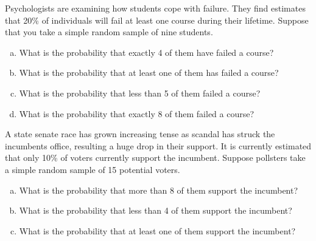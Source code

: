 \documentclass[11pt,letterpaper]{article}
\begin{document}

 Psychologists are examining how students cope with failure. They find estimates that 20\% of individuals will fail at least one course during their lifetime. Suppose that you take a simple random sample of nine students. 
	\begin{enumerate}[(a)]
	\item What is the probability that exactly 4 of them have failed a course?
	\item What is the probability that at least one of them has failed a course?
	\item What is the probability that less than 5 of them failed a course? 
	\item What is the probability that exactly 8 of them failed a course?
	\end{enumerate}



\newpage



 A state senate race has grown increasing tense as scandal has struck the incumbents office, resulting a huge drop in their support. It is currently estimated that only 10\% of voters currently support the incumbent. Suppose pollsters take a simple random sample of 15 potential voters. 
	\begin{enumerate}[(a)]
	\item What is the probability that more than 8 of them support the incumbent? 
	\item What is the probability that less than 4 of them support the incumbent? 
	\item What is the probability that at least one of them support the incumbent?
	\end{enumerate}
\end{document}
